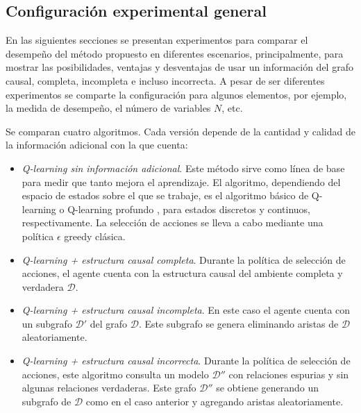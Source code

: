 \subsection{Configuración experimental general}

En las siguientes secciones se presentan experimentos para comparar el desempeño 
del método propuesto en diferentes escenarios, principalmente, para mostrar 
las posibilidades, ventajas y desventajas de usar un información del grafo causal, completa, incompleta e incluso incorrecta. A pesar de ser diferentes
experimentos se comparte la configuración para algunos elementos, por ejemplo, 
la medida de desempeño, el número de variables $N$, etc.

Se comparan cuatro algoritmos. Cada versión depende
de la cantidad y calidad de la información adicional con la que cuenta:

\begin{itemize}
    \item \textit{Q-learning sin información adicional}. Este método sirve como
    línea de base para medir que tanto mejora el aprendizaje. El algoritmo, dependiendo del espacio de estados sobre el que se trabaje, es el 
    algoritmo básico de Q-learning \cite{watkins1992q} o Q-learning profundo \cite{mnih2013playing}, para estados
    discretos y continuos, respectivamente. La selección de acciones se lleva a cabo mediante una política $\epsilon$ greedy clásica.
    \item \textit{Q-learning + estructura causal completa}. Durante la política de selección de acciones, el agente cuenta con la estructura causal del ambiente completa y verdadera $\mathcal{D}$.
    \item \textit{Q-learning + estructura causal incompleta}. En este caso el agente cuenta con un subgrafo $\mathcal{D'}$ del grafo $\mathcal{D}$. Este subgrafo se genera eliminando aristas de $\mathcal{D}$ aleatoriamente.
    \item \textit{Q-learning + estructura causal incorrecta}. Durante la política de selección de acciones, este algoritmo consulta un modelo $\mathcal{D}''$ con relaciones espurias y sin algunas relaciones verdaderas. Este grafo $\mathcal{D}''$ se obtiene generando un subgrafo de $\mathcal{D}$ como en el caso anterior y agregando aristas aleatoriamente.
\end{itemize}

